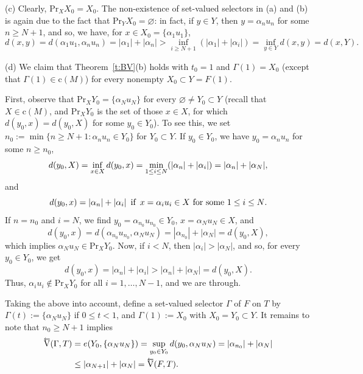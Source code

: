 \documentclass[preprint,12pt]{elsarticle}
\newcommand{\es}{\varnothing}
\newcommand{\leV}{{\scriptstyle\overleftarrow{\mbox{\rm V}}}}
\begin{document}
\begin{exa}
(c) Clearly, $\mbox{Pr}_XX_0=X_0$. The non-existence of set-valued selectors in (a)
and (b) is again due to the fact that $\mbox{Pr}_YX_0=\es$: in fact, if $y\in Y$,
then $y=\alpha_nu_n$ for some $n\ge N+1$, and so, we have,
for $x\in X_0=\{\alpha_1u_1\}$,
  \begin{equation*}
d(x,y)\!=\!d(\alpha_1u_1,\alpha_nu_n)\!=\!|\alpha_1|+|\alpha_n|
\!>\!\!\inf_{i\ge N+1}(|\alpha_1|+|\alpha_i|)\!=\!\inf_{y\in Y}d(x,y)\!=\!d(x,Y).
  \end{equation*}

(d) We claim that Theorem~\ref{t:BV}(b) holds with $t_0=1$ and $\Gamma(1)=X_0$
(except that $\Gamma(1)\in\mbox{c}(M)$) for every nonempty $X_0\subset Y=F(1)$.

First, observe that $\mbox{Pr}_XY_0=\{\alpha_Nu_N\}$ for every
$\es\ne Y_0\subset Y$ (recall that $X\in\mbox{c}(M)$, and $\mbox{Pr}_XY_0$ is the
set of those $x\in X$, for which $d(y_0,x)=d(y_0,X)$ for some $y_0\in Y_0$).
To see this, we set $n_0:=\min\{n\ge N+1:\alpha_nu_n\in Y_0\}$ for $Y_0\subset Y$.
If $y_0\in Y_0$, we have $y_0=\alpha_nu_n$ for some $n\ge n_0$,
  \begin{equation*}
d(y_0,X)=\inf_{x\in X}d(y_0,x)=\min_{1\le i\le N}(|\alpha_n|+|\alpha_i|)
  =|\alpha_n|+|\alpha_N|,\\[2pt]
  \end{equation*}
and
  \begin{equation*}
\mbox{$d(y_0,x)=|\alpha_n|+|\alpha_i|$ \,if \,$x=\alpha_iu_i\in X$ for some $1\le i\le N$.}
  \end{equation*}
If $n=n_0$ and $i=N$, we find $y_0=\alpha_{n_0}u_{n_0}\in Y_0$,
$x=\alpha_Nu_N\in X$, and
  \begin{equation*}
d(y_0,x)=d(\alpha_{n_0}u_{n_0},\alpha_Nu_N)=|\alpha_{n_0}|+|\alpha_N|=d(y_0,X),
  \end{equation*}
which implies $\alpha_Nu_N\in\mbox{Pr}_XY_0$. Now, if $i<N$, then
$|\alpha_i|>|\alpha_N|$, and so, for every $y_0\in Y_0$, we get
  \begin{equation*}
d(y_0,x)=|\alpha_n|+|\alpha_i|>|\alpha_n|+|\alpha_N|=d(y_0,X).
  \end{equation*}
Thus, $\alpha_iu_i\notin\mbox{Pr}_XY_0$ for all $i=1,\dots,N-1$, and we are through.

Taking the above into account, define a set-valued selector $\Gamma$ of $F$ on $T$
by $\Gamma(t):=\{\alpha_Nu_N\}$ if $0\le t<1$, and $\Gamma(1):=X_0$ with
$X_0=Y_0\subset Y$. It remains to note that $n_0\ge N+1$ implies
  \begin{align*}
\leV(\Gamma,T)&=e(Y_0,\{\alpha_Nu_N\})=\sup_{y_0\in Y_0}d(y_0,\alpha_Nu_N)
  =|\alpha_{n_0}|+|\alpha_N|\\
&\le|\alpha_{N+1}|+|\alpha_N|=\leV(F,T).
  \end{align*}
\end{exa}
\end{document}
